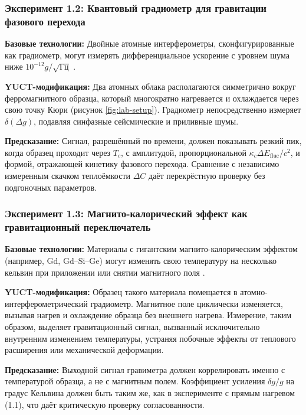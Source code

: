 \documentclass[12pt]{article}
\theoremstyle{remark}
\begin{document}
	\subsubsection{Эксперимент 1.2: Квантовый градиометр для гравитации фазового перехода}
	
	\textbf{Базовые технологии:} Двойные атомные интерферометры, сконфигурированные как градиометр, могут измерять дифференциальное ускорение с уровнем шума ниже \(10^{-12}g/\sqrt{\mathrm{Гц}}\) \cite{Snadden1998}.
	
	\textbf{YUCT-модификация:} Два атомных облака располагаются симметрично вокруг ферромагнитного образца, который многократно нагревается и охлаждается через свою точку Кюри (рисунок \ref{fig:lab-setup}). Градиометр непосредственно измеряет \(\delta(\Delta g)\), подавляя синфазные сейсмические и приливные шумы.
	
	\textbf{Предсказание:} Сигнал, разрешённый по времени, должен показывать резкий пик, когда образец проходит через \(T_c\), с амплитудой, пропорциональной \(\kappa_c \Delta E_{\mathrm{fluc}}/c^2\), и формой, отражающей кинетику фазового перехода. Сравнение с независимо измеренным скачком теплоёмкости \(\Delta C\) даёт перекрёстную проверку без подгоночных параметров.
	
	\subsubsection{Эксперимент 1.3: Магнито-калорический эффект как гравитационный переключатель}
	
	\textbf{Базовые технологии:} Материалы с гигантским магнито-калорическим эффектом (например, Gd, Gd–Si–Ge) могут изменять свою температуру на несколько кельвин при приложении или снятии магнитного поля \cite{Gschneidner1999}.
	
	\textbf{YUCT-модификация:} Образец такого материала помещается в атомно-интерферометрический градиометр. Магнитное поле циклически изменяется, вызывая нагрев и охлаждение образца без внешнего нагрева. Измерение, таким образом, выделяет гравитационный сигнал, вызванный исключительно внутренним изменением температуры, устраняя побочные эффекты от теплового расширения или механической деформации.
	
	\textbf{Предсказание:} Выходной сигнал гравиметра должен коррелировать именно с температурой образца, а не с магнитным полем. Коэффициент усиления \(\delta g/g\) на градус Кельвина должен быть таким же, как в эксперименте с прямым нагревом (1.1), что даёт критическую проверку согласованности.
	
\end{document}
